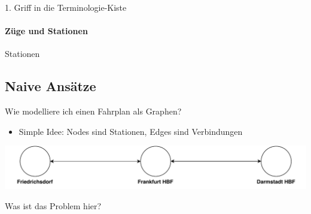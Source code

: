 \begin{frame}{1. Griff in die Terminologie-Kiste}
	\framesubtitle{Züge und Stationen}

	\begin{block}{}
		Stationen
	\end{block}
	
	\begin{center}
	\end{center}
\end{frame}


\subsection{Naive Ansätze}
\begin{frame}{Wie modelliere ich einen Fahrplan als Graphen?}
	\begin{itemize}
		\item Simple Idee: Nodes sind Stationen, Edges sind Verbindungen 
	\end{itemize}
	
	\includegraphics[width=\linewidth]{images/simple-approach.pdf} \pause

	\begin{block}{}
		Was ist das Problem hier?
	\end{block}
\end{frame}

